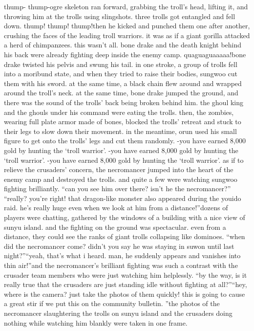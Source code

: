 thump- thump-ogre skeleton ran forward, grabbing the troll’s head, lifting it, and throwing him at the trolls using slingshots.
 three trolls got entangled and fell down.
thump! thump! thump!then he kicked and punched them one after another, crushing the faces of the leading troll warriors.
 it was as if a giant gorilla attacked a herd of chimpanzees.
this wasn’t all.
 bone drake and the death knight behind his back were already fighting deep inside the enemy camp.
quaguaguaaaaa!bone drake twisted his pelvis and swung his tail.
 in one stroke, a group of trolls fell into a moribund state, and when they tried to raise their bodies, sungwoo cut them with his sword.
at the same time, a black chain flew around and wrapped around the troll’s neck.
 at the same time, bone drake jumped the ground, and there was the sound of the trolls’ back being broken behind him.
the ghoul king and the ghouls under his command were eating the trolls.
then, the zombies, wearing full plate armor made of bones, blocked the trolls’ retreat and stuck to their legs to slow down their movement.
in the meantime, orun used his small figure to get onto the trolls’ legs and cut them randomly.
-you have earned 8,000 gold by hunting the ‘troll warrior’.
-you have earned 8,000 gold by hunting the ‘troll warrior’.
-you have earned 8,000 gold by hunting the ‘troll warrior’.
as if to relieve the crusaders’ concern, the necromancer jumped into the heart of the enemy camp and destroyed the trolls.
and quite a few were watching sungwoo fighting brilliantly.
“can you see him over there? isn’t he the necromancer?”
“really? you’re right! that dragon-like monster also appeared during the youido raid.
 he’s really huge even when we look at him from a distance!”dozens of players were chatting, gathered by the windows of a building with a nice view of sunyu island.
and the fighting on the ground was spectacular.
 even from a distance, they could see the ranks of giant trolls collapsing like dominoes.
“when did the necromancer come? didn’t you say he was staying in suwon until last night?”“yeah, that’s what i heard.
 man, he suddenly appears and vanishes into thin air!”and the necromancer’s brilliant fighting was such a contrast with the crusader team members who were just watching him helplessly.
“by the way, is it really true that the crusaders are just standing idle without fighting at all?”“hey, where is the camera? just take the photos of them quickly! this is going to cause a great stir if we put this on the community bulletin.
”the photos of the necromancer slaughtering the trolls on sunyu island and the crusaders doing nothing while watching him blankly were taken in one frame.
